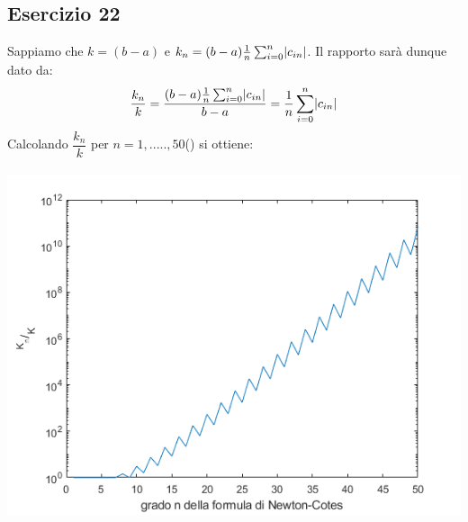 \subsection{Esercizio 22}
Sappiamo che $k = (b-a)$ e $k_n=(b-a)\frac{1}{n}\sum_{i=0}^{n}\lvert c_{in}\rvert$. Il rapporto sarà dunque dato da: \[\dfrac{k_n}{k} = 
\dfrac{(b-a)\frac{1}{n}\sum_{i=0}^{n}\lvert c_{in}\rvert}{b-a} = \frac{1}{n}\sum_{i=0}^{n}\lvert c_{in}\rvert \]
Calcolando $\dfrac{k_n}{k}$ per $n = 1,.....,50$() si ottiene:\\\\
    \includegraphics[width=\linewidth]{capitolo5/ncotes.png}

